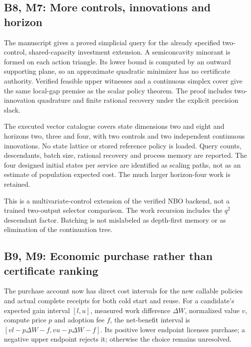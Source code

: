 \documentclass[ecta,nameyear,draft]{econsocart}
\begin{document}
\hypertarget{b8-m7-more-controls-innovations-and-horizon}{%
\subsection{B8, M7: More controls, innovations and
horizon}\label{b8-m7-more-controls-innovations-and-horizon}}

The manuscript gives a proved simplicial query for the already specified
two-control, shared-capacity investment extension. A semiconcavity
minorant is formed on each action triangle. Its lower bound is computed
by an outward supporting plane, so an approximate quadratic minimizer
has no certificate authority. Verified feasible upper witnesses and a
continuous simplex cover give the same local-gap premise as the scalar
policy theorem. The proof includes two-innovation quadrature and finite
rational recovery under the explicit precision slack.

The executed vector catalogue covers state dimensions two and eight and
horizons two, three and four, with two controls and two independent
continuous innovations. No state lattice or stored reference policy is
loaded. Query counts, descendants, batch size, rational recovery and
process memory are reported. The four designed initial states per
service are identified as scaling paths, not as an estimate of
population expected cost. The much larger horizon-four work is retained.

This is a multivariate-control extension of the verified NBO backend,
not a trained two-output selector comparison. The work recursion
includes the \(q^2\) descendant factor. Batching is not mislabeled as
depth-first memory or as elimination of the continuation tree.

\hypertarget{b9-m9-economic-purchase-rather-than-certificate-ranking}{%
\subsection{B9, M9: Economic purchase rather than certificate
ranking}\label{b9-m9-economic-purchase-rather-than-certificate-ranking}}

The purchase account now has direct cost intervals for the new callable
policies and actual complete receipts for both cold start and reuse. For
a candidate's expected gain interval \([l,u]\), measured work difference
\(\Delta W\), normalized value \(v\), compute price \(p\) and adoption
fee \(f\), the net-benefit interval is
\([vl-p\Delta W-f,vu-p\Delta W-f]\). Its positive lower endpoint
licenses purchase; a negative upper endpoint rejects it; otherwise the
choice remains unresolved.
\end{document}
